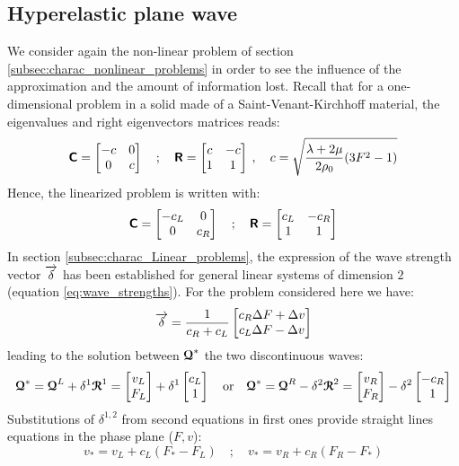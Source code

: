 \subsection{Hyperelastic plane wave}
We consider again the non-linear problem of section \ref{subsec:charac_nonlinear_problems} in order to see the influence of the approximation and the amount of information lost. Recall that for a one-dimensional problem in a solid made of a Saint-Venant-Kirchhoff material, the eigenvalues and right eigenvectors matrices reads:
\begin{equation}
  \label{eq:SVK_matrices}
  \boldsymbol{\mathsf{C}} = \left[\begin{matrix}-c & 0 \\ 0 & c\end{matrix}\right] \quad ; \quad \boldsymbol{\mathsf{R}} = \left[\begin{matrix}c & -c\\ 1&1\end{matrix}\right] \:,\quad c=\sqrt{\frac{\lambda + 2\mu}{2\rho_0}(3F^2-1)}
\end{equation}
Hence, the linearized problem is written with:
\begin{equation}
  \label{eq:SVK_matrices_linear}
  \boldsymbol{\mathsf{C}} = \left[\begin{matrix}-c_L & 0 \\ 0 & c_R\end{matrix}\right] \quad ; \quad \boldsymbol{\mathsf{R}} = \left[\begin{matrix}c_L & -c_R\\ 1&1\end{matrix}\right]
\end{equation}
In section \ref{subsec:charac_Linear_problems}, the expression of the wave strength vector ${\overrightarrow{\delta}}$ has been established for general linear systems of dimension $2$ (equation \eqref{eq:wave_strengths}). For the problem considered here we have:
\begin{equation}
  {\overrightarrow{\delta}}=\frac{1}{c_R+c_L}\left[\begin{matrix}c_R \Delta F +\Delta v\\ c_L \Delta F -\Delta v\end{matrix}\right]
\end{equation}
leading to the solution between ${\boldsymbol{\mathcal{Q}}}^*$ the two discontinuous waves:
\begin{equation}
  \label{eq:SVK_approx_solution}
  {\boldsymbol{\mathcal{Q}}}^* = {\boldsymbol{\mathcal{Q}}}^L + \delta^1 {\boldsymbol{\mathcal{R}}}^1 = \left[\begin{matrix}v_L \\F_L\end{matrix}\right] +\delta^1 \left[\begin{matrix}c_L \\1\end{matrix}\right] \quad \text{or} \quad {\boldsymbol{\mathcal{Q}}}^* = {\boldsymbol{\mathcal{Q}}}^R - \delta^2 {\boldsymbol{\mathcal{R}}}^2 = \left[\begin{matrix}v_R \\F_R\end{matrix}\right] -\delta^2 \left[\begin{matrix}-c_R \\1\end{matrix}\right]
\end{equation}
Substitutions of $\delta^{1,2}$ from second equations in first ones provide straight lines equations in the phase plane ($F,v$):
\begin{equation}
  \label{eq:approx_straight}
  v_* = v_L + c_L(F_*-F_L) \quad ; \quad v_* = v_R + c_R(F_R-F_*)
\end{equation}

